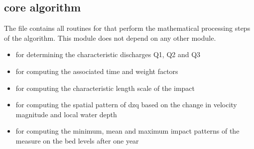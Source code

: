 \subsection{core algorithm }

The  file contains all routines for that perform the mathematical processing steps of the algorithm.
This module does not depend on any other \dfastmi module.

\begin{itemize}
\item {} for determining the characteristic discharges Q1, Q2 and Q3
\item {} for computing the associated time and weight factors
\item {} for computing the characteristic length scale of the impact
\item {} for computing the spatial pattern of dzq based on the change in velocity magnitude and local water depth
\item {} for computing the minimum, mean and maximum impact patterns of the measure on the bed levels after one year
\end{itemize}
